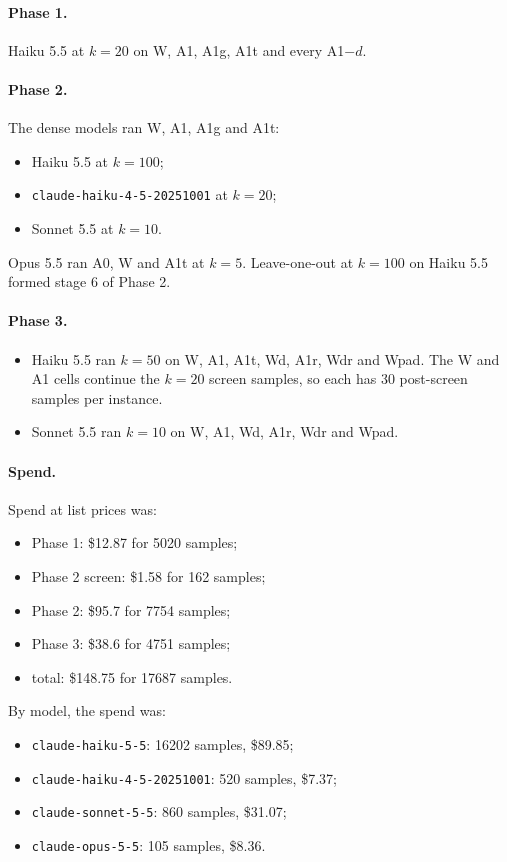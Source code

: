 \paragraph{Phase 1.} Haiku 5.5 at $k=20$ on W, A1, A1g, A1t and every A1$-d$.

\paragraph{Phase 2.} The dense models ran W, A1, A1g and A1t:
\begin{itemize}
\item Haiku 5.5 at $k=100$;
\item \texttt{claude-haiku-4-5-20251001} at $k=20$;
\item Sonnet 5.5 at $k=10$.
\end{itemize}
Opus 5.5 ran A0, W and A1t at $k=5$. Leave-one-out at $k=100$ on Haiku 5.5 formed stage 6 of Phase 2.

\paragraph{Phase 3.}
\begin{itemize}
\item Haiku 5.5 ran $k=50$ on W, A1, A1t, Wd, A1r, Wdr and Wpad. The W and A1 cells continue the $k=20$ screen samples, so each has 30 post-screen samples per instance.
\item Sonnet 5.5 ran $k=10$ on W, A1, Wd, A1r, Wdr and Wpad.
\end{itemize}

\paragraph{Spend.} Spend at list prices was:
\begin{itemize}
\item Phase 1: \$12.87 for 5020 samples;
\item Phase 2 screen: \$1.58 for 162 samples;
\item Phase 2: \$95.7 for 7754 samples;
\item Phase 3: \$38.6 for 4751 samples;
\item total: \$148.75 for 17687 samples.
\end{itemize}

By model, the spend was:
\begin{itemize}
\item \texttt{claude-haiku-5-5}: 16202 samples, \$89.85;
\item \texttt{claude-haiku-4-5-20251001}: 520 samples, \$7.37;
\item \texttt{claude-sonnet-5-5}: 860 samples, \$31.07;
\item \texttt{claude-opus-5-5}: 105 samples, \$8.36.
\end{itemize}

